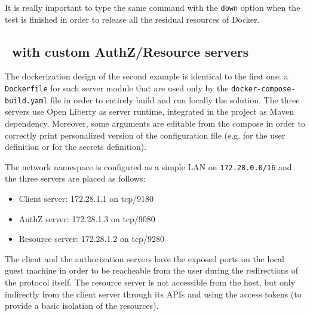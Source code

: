 It is really important to type the same command with the \texttt{down} option when the test is finished in order to release all the residual resources of Docker.

\subsection{\oauth\ with custom AuthZ/Resource servers}
The dockerization design of the second example is identical to the first one: a \texttt{Dockerfile} for each server module that are used only by the \texttt{docker-compose-build.yaml} file in order to entirely build and run locally the solution. The three servers use Open Liberty as server runtime, integrated in the project as Maven dependency. Moreover, some arguments are editable from the compose in order to correctly print personalized version of the configuration file (e.g. for the user definition or for the secrets definition).

The network namespace is configured as a simple LAN on \texttt{172.28.0.0/16} and the three servers are placed as follows:

\begin{itemize}
    \item Client server: 172.28.1.1 on tcp/9180
    \item AuthZ server: 172.28.1.3 on tcp/9080
    \item Resource server: 172.28.1.2 on tcp/9280
\end{itemize}

The client and the authorization servers have the exposed ports on the local guest machine in order to be reacheable from the user during the redirections of the protocol itself. The resource server is not accessible from the host, but only indirectly from the client server through its APIs and using the access tokens (to provide a basic isolation of the resources).

\label{docker}

